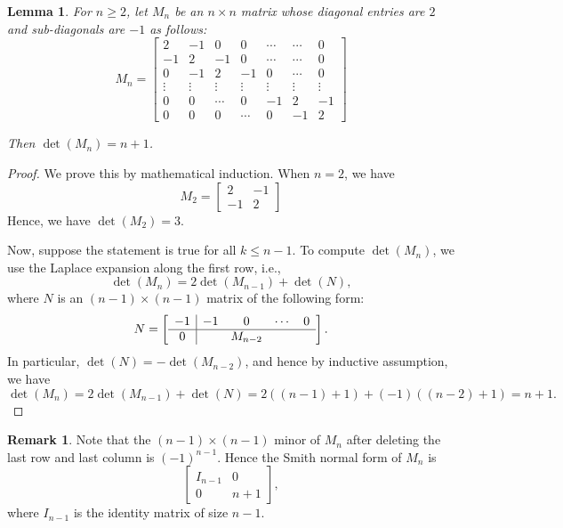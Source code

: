 \documentclass[11pt,reqno]{amsart}
\theoremstyle{definition}
\newtheorem{rmk}[mydef]{Remark}
\theoremstyle{plain}
\newtheorem{lemma}[mydef]{Lemma}
\begin{document}
\begin{lemma} \label{lemma: obj3}
For $n \ge 2$, let $M_n$ be an $n \times n$ matrix whose diagonal entries are $2$ and sub-diagonals are $-1$ as follows:
\begin{equation}\label{eq: m_n}
M_n = \begin{bmatrix}
2 & -1 & 0 & 0& \cdots & \cdots & 0 \\
-1 & 2 & -1& 0& \cdots &\cdots & 0 \\
0 & -1 & 2 & -1 & 0& \cdots & 0 \\
\vdots & \vdots & \vdots & \vdots & \vdots& \vdots & \vdots \\
0 & 0 & \cdots& 0 & -1 & 2 & -1 \\
0 & 0 &0 & \cdots & 0 &  -1 & 2 
\end{bmatrix}
\end{equation}

Then $\det (M_n) = n+1$. 
\end{lemma}

\begin{proof}
We prove this by mathematical induction. 
When $n=2$, we have
\[
M_2 = \begin{bmatrix}
	2 & -1 \\
	-1 & 2
\end{bmatrix}
\]
Hence, we have $\det(M_2) = 3$. 

Now, suppose the statement is true for all $k \le n-1$. 
To compute $\det (M_n)$, we use the Laplace expansion along the first row, i.e., 
\[
\det (M_n) = 2 \det (M_{n-1}) + \det(N),
\]
where $N$ is an $(n-1)\times(n-1)$ matrix of the following form:
\begin{equation}
N=\left[ \begin{array}{c|c c c c c  }
-1 &  -1& 0 & \cdots & 0 \\
\hline 
0 &  &  M_{n-2}
\end{array} \right].
\end{equation}
In particular, $\det(N)=-\det(M_{n-2})$, and hence by inductive assumption, we have 
\[
\det(M_n)=2\det(M_{n-1})+\det(N) = 2((n-1)+1) + (-1)((n-2)+1)=n+1.
\]
\end{proof}



\begin{rmk}\label{remark: key}
Note that the $(n-1) \times (n-1)$ minor of $M_n$ after deleting the last row and last column is $(-1)^{n-1}$. 
Hence the Smith normal form of $M_n$ is 
\begin{equation}
\left[ \begin{array}{c|c}
I_{n-1} & 0 \\
\hline 
0 & n+1 
\end{array} \right],
\end{equation}
where $I_{n-1}$ is the identity matrix of size $n-1$. 
\end{rmk}
\end{document}
